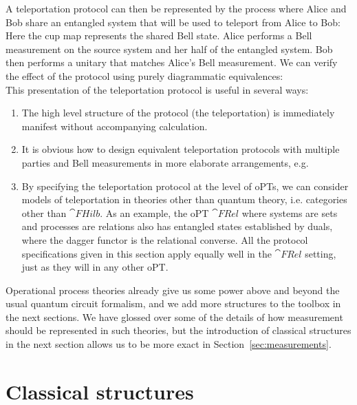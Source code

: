 \begin{example}
A teleportation protocol can then be represented by the process where Alice and Bob share an entangled system that will be used to teleport from Alice to Bob:
\begin{equation}

\end{equation}
Here the cup map represents the shared Bell state.  Alice performs a Bell measurement on the source system and her half of the entangled system. Bob then performs a unitary that matches Alice's Bell measurement. We can verify the effect of the protocol using purely diagrammatic equivalences:
\begin{equation}
\label{eq:teleportderive}

\end{equation}
This presentation of the teleportation protocol is useful in several ways:
\begin{enumerate}
\item The high level structure of the protocol (the teleportation) is immediately manifest without accompanying calculation.
\item It is obvious how to design equivalent teleportation protocols with multiple parties and Bell measurements in more elaborate arrangements, e.g.
\begin{equation}

\end{equation}
\item By specifying the teleportation protocol at the level of oPTs, we can consider models of teleportation in theories other than quantum theory, i.e. categories other than $\cat{FHilb}$. As an example, the oPT $\cat{FRel}$ where systems are sets and processes are relations also has entangled states established by duals, where the dagger functor is the relational converse. All the protocol specifications given in this section apply equally well in the $\cat{FRel}$ setting, just as they will in any other oPT.
\end{enumerate}
\end{example}

Operational process theories already give us some power above and beyond the usual quantum circuit formalism, and we add more structures to the toolbox in the next sections.  We have glossed over some of the details of how measurement should be represented in such theories, but the introduction of classical structures in the next section allows us to be more exact in Section~\ref{sec:measurements}. 

\section{Classical structures}
\label{sec:observables}


